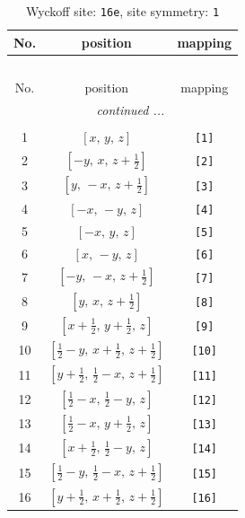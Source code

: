 \documentclass[fleqn,8pt]{jsarticle}
\begin{document}
\begin{longtable}{ccc}
\caption{Wyckoff site: {\tt 16e}, site symmetry: {\tt 1}}
 \\
 \hline \hline
No. & position & mapping \\ \hline \endfirsthead

\multicolumn{2}{l}{\tablename\ \thetable{}} \\
 \hline \hline
No. & position & mapping \\ \hline \endhead

 \hline \hline
\multicolumn{2}{r}{\footnotesize\it continued ...} \\ \endfoot

 \hline \hline
\multicolumn{2}{r}{} \\ \endlastfoot

1 & $\left[ x,\, y,\, z \right]$ & {\tt [1]} \\ \hline
2 & $\left[ - y,\, x,\, z + \frac{1}{2} \right]$ & {\tt [2]} \\ \hline
3 & $\left[ y,\, - x,\, z + \frac{1}{2} \right]$ & {\tt [3]} \\ \hline
4 & $\left[ - x,\, - y,\, z \right]$ & {\tt [4]} \\ \hline
5 & $\left[ - x,\, y,\, z \right]$ & {\tt [5]} \\ \hline
6 & $\left[ x,\, - y,\, z \right]$ & {\tt [6]} \\ \hline
7 & $\left[ - y,\, - x,\, z + \frac{1}{2} \right]$ & {\tt [7]} \\ \hline
8 & $\left[ y,\, x,\, z + \frac{1}{2} \right]$ & {\tt [8]} \\ \hline
9 & $\left[ x + \frac{1}{2},\, y + \frac{1}{2},\, z \right]$ & {\tt [9]} \\ \hline
10 & $\left[ \frac{1}{2} - y,\, x + \frac{1}{2},\, z + \frac{1}{2} \right]$ & {\tt [10]} \\ \hline
11 & $\left[ y + \frac{1}{2},\, \frac{1}{2} - x,\, z + \frac{1}{2} \right]$ & {\tt [11]} \\ \hline
12 & $\left[ \frac{1}{2} - x,\, \frac{1}{2} - y,\, z \right]$ & {\tt [12]} \\ \hline
13 & $\left[ \frac{1}{2} - x,\, y + \frac{1}{2},\, z \right]$ & {\tt [13]} \\ \hline
14 & $\left[ x + \frac{1}{2},\, \frac{1}{2} - y,\, z \right]$ & {\tt [14]} \\ \hline
15 & $\left[ \frac{1}{2} - y,\, \frac{1}{2} - x,\, z + \frac{1}{2} \right]$ & {\tt [15]} \\ \hline
16 & $\left[ y + \frac{1}{2},\, x + \frac{1}{2},\, z + \frac{1}{2} \right]$ & {\tt [16]} \\
\end{longtable}
\end{document}
